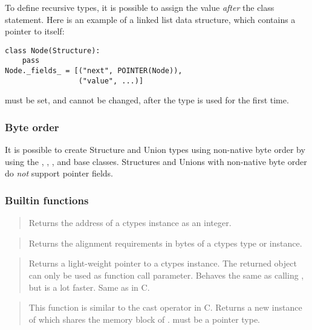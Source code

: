 To define recursive types, it is possible to assign the 
value \emph{after} the class statement.  Here is an example of a linked
list data structure, which contains a pointer to itself:
\begin{verbatim}
class Node(Structure):
    pass
Node._fields_ = [("next", POINTER(Node)),
                 ("value", ...)]
\end{verbatim}

 must be set, and cannot be changed, after the type is
used for the first time.


\subsubsection{Byte order\label{ctypes-byte-order}}

It is possible to create Structure and Union types using non-native
byte order by using the ,
, , and
 base classes.  Structures and Unions with
non-native byte order do \emph{not} support pointer fields.


\subsubsection{Builtin functions\label{ctypes-builtin-functions}}

\begin{quote}

Returns the address of a ctypes instance as an integer.
\end{quote}

\begin{quote}

Returns the alignment requirements in bytes of a ctypes type or
instance.
\end{quote}

\begin{quote}

Returns a light-weight pointer to a ctypes instance.  The returned
object can only be used as function call parameter.  Behaves the
same as calling , but is a lot faster.  Same as
 in C.
\end{quote}

\begin{quote}

This function is similar to the cast operator in C.  Returns a new
instance of  which shares the memory block of .
 must be a pointer type.
\end{quote}

